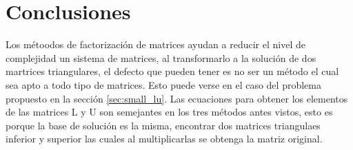 \section{Conclusiones}

Los métoodos de factorización de matrices ayudan a reducir el nivel de complejidad un sistema de matrices, al transformarlo a la solución de dos martrices triangulares, el defecto que pueden tener es no ser un método el cual sea apto a todo tipo de matrices. Esto puede verse en el caso del problema propuesto en la sección \ref{sec:small_lu}. Las ecuaciones para obtener los elementos de las matrices L y U son semejantes en los tres métodos antes vistos, esto es porque la base de solución es la misma, encontrar dos matrices triangulaes inferior y superior las cuales al multiplicarlas se obtenga la matriz original.